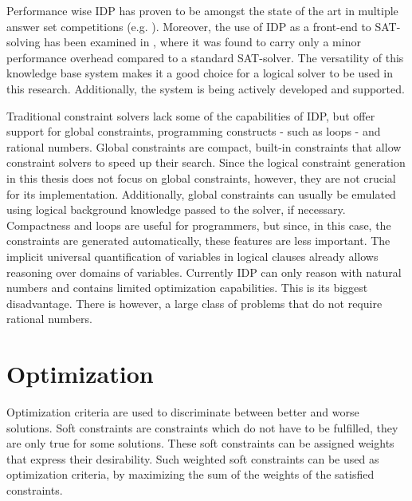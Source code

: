 

Performance wise IDP has proven to be amongst the state of the art in multiple answer set competitions (e.g. \cite{calimeri2014third}).
Moreover, the use of IDP as a front-end to SAT-solving has been examined in \cite{bruynooghe2014predicate}, where it was found to carry only a minor performance overhead compared to a standard SAT-solver.
The versatility of this knowledge base system makes it a good choice for a logical solver to be used in this research.
Additionally, the system is being actively developed and supported.

Traditional constraint solvers lack some of the capabilities of IDP, but offer support for global constraints, programming constructs - such as loops - and rational numbers.
Global constraints are compact, built-in constraints that allow constraint solvers to speed up their search.
Since the logical constraint generation in this thesis does not focus on global constraints, however, they are not crucial for its implementation.
Additionally, global constraints can usually be emulated using logical background knowledge passed to the solver, if necessary.
Compactness and loops are useful for programmers, but since, in this case, the constraints are generated automatically, these features are less important.
The implicit universal quantification of variables in logical clauses already allows reasoning over domains of variables.
Currently IDP can only reason with natural numbers and contains limited optimization capabilities.
This is its biggest disadvantage.
There is however, a large class of problems that do not require rational numbers.

\section{Optimization}
Optimization criteria are used to discriminate between better and worse solutions.
Soft constraints are constraints which do not have to be fulfilled, they are only true for some solutions.
These soft constraints can be assigned weights that express their desirability.
Such weighted soft constraints can be used as optimization criteria, by maximizing the sum of the weights of the satisfied constraints.

